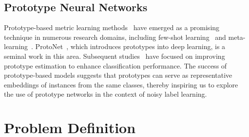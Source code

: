 \documentclass[letterpaper]{article} %
\begin{document}
\subsection{Prototype Neural Networks}
Prototype-based metric learning methods~\cite{DBLP:conf/nips/SnellSZ17} have emerged as a promising technique in numerous research domains, including few-shot learning~\cite{DBLP:journals/csur/WangYKN20} and meta-learning~\cite{DBLP:journals/air/VilaltaD02}. ProtoNet~\cite{DBLP:conf/nips/SnellSZ17}, which introduces prototypes into deep learning, is a seminal work in this area. Subsequent studies~\cite{DBLP:conf/cvpr/LiJSSKK21, DBLP:conf/iclr/0001ZXH21} have focused on improving prototype estimation to enhance classification performance. The success of prototype-based models suggests that prototypes can serve as representative embeddings of instances from the same classes, thereby inspiring us to explore the use of prototype networks in the context of noisy label learning.


\section{Problem Definition}

\end{document}
